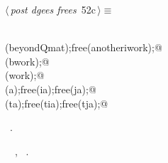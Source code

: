 \documentclass{article}
\begin{document}
\begin{flushleft} \small
\begin{minipage}{\linewidth}\label{scrap76}\raggedright\small
{} $\langle\,${\itshape post dgees frees}\nobreak\ {\footnotesize {52c}}$\,\rangle\equiv$
\vspace{-1ex}
\begin{list}{}{} \item
\mbox{}\verb@@\\
\mbox{}\verb@free(beyondQmat);free(anotheriwork);@\\
\mbox{}\verb@free(bwork);@\\
\mbox{}\verb@free(work);@\\
\mbox{}\verb@free(a);free(ia);free(ja);@\\
\mbox{}\verb@free(ta);free(tia);free(tja);@\\
\mbox{}\verb@@{\NWsep}
\end{list}
\vspace{-1.5ex}
\footnotesize
\begin{list}{}{\setlength{\itemsep}{-\parsep}\setlength{\itemindent}{-\leftmargin}}
\item \NWtxtMacroRefIn\ .
\item \NWtxtIdentsUsed\nobreak\  \verb@ia@\nobreak\ , \verb@work@\nobreak\ .
\item{}
\end{list}
\end{minipage}\vspace{4ex}
\end{flushleft}
\end{document}
